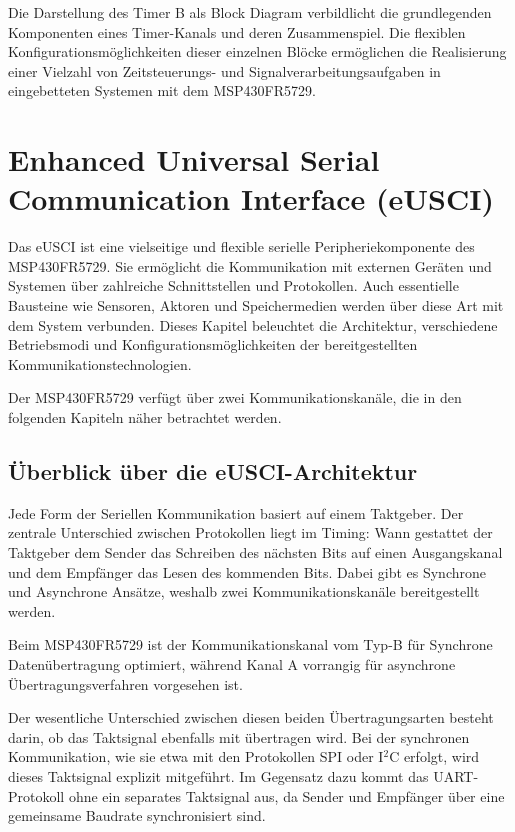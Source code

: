 Die Darstellung  des Timer B als Block Diagram verbildlicht die grundlegenden Komponenten eines Timer-Kanals und deren Zusammenspiel. Die flexiblen Konfigurationsm\"oglichkeiten dieser einzelnen Bl\"ocke erm\"oglichen die Realisierung einer Vielzahl von Zeitsteuerungs- und Signalverarbeitungsaufgaben in eingebetteten Systemen mit dem MSP430FR5729.

\newpage
\section{Enhanced Universal Serial Communication Interface (eUSCI)}
\label{eUSCI}

Das eUSCI ist eine vielseitige und flexible serielle Peripheriekomponente des MSP430FR5729. Sie erm\"oglicht die Kommunikation mit externen Ger\"aten und Systemen \"uber zahlreiche Schnittstellen und Protokollen. Auch essentielle Bausteine wie Sensoren, Aktoren und Speichermedien werden \"uber diese Art mit dem System verbunden. Dieses Kapitel beleuchtet die Architektur, verschiedene Betriebsmodi und Konfigurationsm\"oglichkeiten der bereitgestellten Kommunikationstechnologien.

Der MSP430FR5729 verf\"ugt \"uber zwei Kommunikationskan\"ale, die in den folgenden Kapiteln n\"aher betrachtet werden. 

\subsection{\"Uberblick \"uber die eUSCI-Architektur}
\label{eUSCI_Architektur}

Jede Form der Seriellen Kommunikation basiert auf einem Taktgeber. Der zentrale Unterschied zwischen Protokollen liegt im Timing: Wann gestattet der Taktgeber dem Sender das Schreiben des n\"achsten Bits auf einen Ausgangskanal und dem Empf\"anger das Lesen des kommenden Bits. Dabei gibt es Synchrone und Asynchrone Ans\"atze, weshalb zwei Kommunikationskan\"ale bereitgestellt werden. 

Beim MSP430FR5729 ist der Kommunikationskanal vom Typ-B f\"ur Synchrone Daten\"ubertragung optimiert, w\"ahrend Kanal A vorrangig f\"ur asynchrone \"Ubertragungsverfahren vorgesehen ist. 

Der wesentliche Unterschied zwischen diesen beiden \"Ubertragungsarten besteht darin, ob das Taktsignal ebenfalls mit \"ubertragen wird. Bei der synchronen Kommunikation, wie sie etwa mit den Protokollen SPI oder I$^{2}$C erfolgt, wird dieses Taktsignal explizit mitgef\"uhrt. Im Gegensatz dazu kommt das UART-Protokoll ohne ein separates Taktsignal aus, da Sender und Empf\"anger \"uber eine gemeinsame Baudrate synchronisiert sind. 

